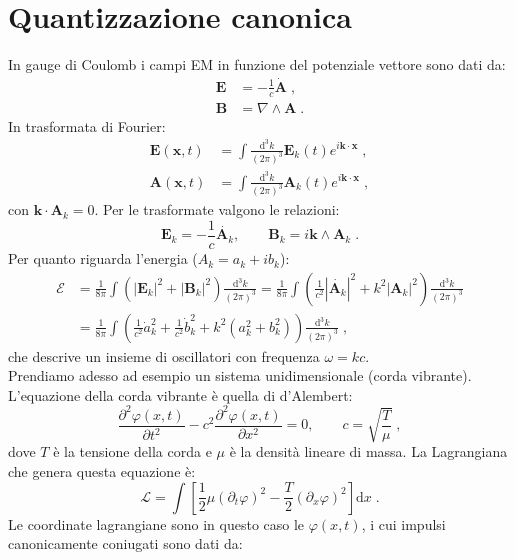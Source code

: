 \documentclass[10pt,a4paper]{report}
\theoremstyle{definition}
\newcommand{\pdev}[3][]{\frac{\partial^{#1} #2}{\partial #3^{#1}}}
\newcommand{\lag}{\mathcal{L}}
\numberwithin{equation}{section}
\newcommand{\diff}[1][]{\mathrm{d}#1}
\begin{document}
\section{Quantizzazione canonica}
In gauge di Coulomb i campi EM in funzione del potenziale vettore sono dati da:
\begin{align*}
\mathbf{E}&=-\frac{1}{c}\dot{\mathbf{A}}\;, \\
\mathbf{B}&=\nabla\wedge\mathbf{A}\;.
\end{align*}
In trasformata di Fourier:
\begin{align}
\mathbf{E}(\mathbf{x},t) &=\int \frac{\diff^3{k}}{(2\pi)^3}\mathbf{E}_k(t)e^{i\mathbf{k}\cdot\mathbf{x}}\;, \\
\mathbf{A}(\mathbf{x},t) &=\int \frac{\diff^3{k}}{(2\pi)^3}\mathbf{A}_k(t)e^{i\mathbf{k}\cdot\mathbf{x}}\;,
\end{align}
con $\mathbf{k}\cdot\mathbf{A}_k=0$. Per le trasformate valgono le relazioni:
\begin{equation}
\mathbf{E}_k=-\frac{1}{c}\dot{\mathbf{A}_k},\qquad \mathbf{B}_k=i\mathbf{k}\wedge\mathbf{A}_k\;.
\end{equation}
Per quanto riguarda l'energia ($A_k=a_k+ib_k$):
\begin{align}
\mathcal{E} &= \frac{1}{8\pi}\int(|\mathbf{E}_k|^2+|\mathbf{B}_k|^2)\frac{\diff^3{k}}{(2\pi)^3}=\frac{1}{8\pi}\int\left(\frac{1}{c^2}|\dot{\mathbf{A}_k}|^2+k^2|\mathbf{A}_k|^2\right)\frac{\diff^3{k}}{(2\pi)^3} \\
&=\frac{1}{8\pi}\int\left(\frac{1}{c^2}\dot{a}_k^2+\frac{1}{c^2}\dot{b}_k^2+k^2(a_k^2+b_k^2)\right)\frac{\diff^3{k}}{(2\pi)^3}\;,
\end{align}
che descrive un insieme di oscillatori con frequenza $\omega=kc$. \\
Prendiamo adesso ad esempio un sistema unidimensionale (corda vibrante). L'equazione della corda vibrante è quella di d'Alembert:
\begin{equation}
\pdev[2]{\varphi(x,t)}{t}-c^2\pdev[2]{\varphi(x,t)}{x}=0,\qquad c=\sqrt{\frac{T}{\mu}}\;,
\end{equation}
dove $T$ è la tensione della corda e $\mu$ è la densità lineare di massa. La Lagrangiana che genera questa equazione è:
\begin{equation}
\lag=\int\left[\frac{1}{2}\mu(\partial_t\varphi)^2-\frac{T}{2}(\partial_x\varphi)^2\right]\diff{x}\;.
\end{equation}
Le coordinate lagrangiane sono in questo caso le $\varphi(x,t)$, i cui impulsi canonicamente coniugati sono dati da:
\end{document}

